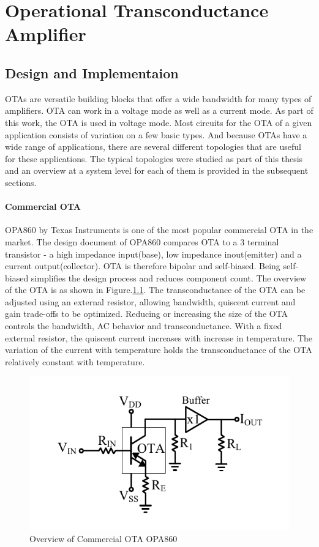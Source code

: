 \chapter{Operational Transconductance Amplifier}

\section{Design and Implementaion}
OTAs are versatile building blocks that offer a wide bandwidth for many types of amplifiers. OTA can work in a voltage mode as well as a current mode. As part of this work, the OTA is used in voltage mode. Most circuits for the OTA of a given application consists of variation on a few basic types. And because OTAs have a wide range of applications, there are several different topologies that are useful for these applications. The typical topologies were studied as part of this thesis and an overview at a system level for each of them is provided in the subsequent sections.

\subsubsection{Commercial OTA}
OPA860 by Texas Instruments is one of the most popular commercial OTA in the market. The design document \cite{opa860} of OPA860 compares OTA to a 3 terminal transistor - a high impedance input(base), low impedance inout(emitter) and a current output(collector). OTA is therefore bipolar and self-biased. Being self-biased simplifies the design process and reduces component count. The overview of the OTA is as shown in Figure.\ref{fig:OPA}. The transconductance of the OTA can be adjusted using an external resistor, allowing bandwidth, quiscent current and gain trade-offs to be optimized. Reducing or increasing the size of the OTA controls the bandwidth, AC behavior and transconductance. With a fixed external resistor, the quiscent current increases with increase in temperature. The variation of the current with temperature holds the transconductance of the OTA relatively constant with temperature.

\begin{figure} [H]
\centering
\includegraphics[scale=1]{Figures/Misc/PDFs/OPA.pdf}
\caption{Overview of Commercial OTA OPA860}
\label{fig:OPA}
\end{figure}

